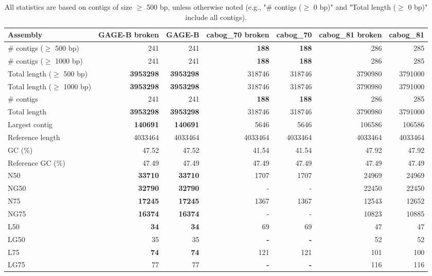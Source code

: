 \documentclass[12pt,a4paper]{article}
\begin{document}
\begin{table}[ht]
\begin{center}
\caption{All statistics are based on contigs of size $\geq$ 500 bp, unless otherwise noted (e.g., "\# contigs ($\geq$ 0 bp)" and "Total length ($\geq$ 0 bp)" include all contigs).}
\begin{tabular}{|l*{6}{|r}|}
\hline
Assembly & GAGE-B broken & GAGE-B & cabog\_70 broken & cabog\_70 & cabog\_81 broken & cabog\_81 \\ \hline
\# contigs ($\geq$ 500 bp) & 241 & 241 & {\bf 188} & {\bf 188} & 286 & 285 \\ \hline
\# contigs ($\geq$ 1000 bp) & 241 & 241 & {\bf 188} & {\bf 188} & 286 & 285 \\ \hline
Total length ($\geq$ 500 bp) & {\bf 3953298} & {\bf 3953298} & 318746 & 318746 & 3790980 & 3791000 \\ \hline
Total length ($\geq$ 1000 bp) & {\bf 3953298} & {\bf 3953298} & 318746 & 318746 & 3790980 & 3791000 \\ \hline
\# contigs & 241 & 241 & {\bf 188} & {\bf 188} & 286 & 285 \\ \hline
Total length & {\bf 3953298} & {\bf 3953298} & 318746 & 318746 & 3790980 & 3791000 \\ \hline
Largest contig & {\bf 140691} & {\bf 140691} & 5646 & 5646 & 106586 & 106586 \\ \hline
Reference length & 4033464 & 4033464 & 4033464 & 4033464 & 4033464 & 4033464 \\ \hline
GC (\%) & 47.52 & 47.52 & 41.54 & 41.54 & 47.92 & 47.92 \\ \hline
Reference GC (\%) & 47.49 & 47.49 & 47.49 & 47.49 & 47.49 & 47.49 \\ \hline
N50 & {\bf 33710} & {\bf 33710} & 1707 & 1707 & 24969 & 24969 \\ \hline
NG50 & {\bf 32790} & {\bf 32790} & - & - & 22450 & 22450 \\ \hline
N75 & {\bf 17245} & {\bf 17245} & 1367 & 1367 & 12543 & 12652 \\ \hline
NG75 & {\bf 16374} & {\bf 16374} & - & - & 10823 & 10885 \\ \hline
L50 & {\bf 34} & {\bf 34} & 69 & 69 & 47 & 47 \\ \hline
LG50 & 35 & 35 & {\bf -} & {\bf -} & 52 & 52 \\ \hline
L75 & {\bf 74} & {\bf 74} & 121 & 121 & 101 & 100 \\ \hline
LG75 & 77 & 77 & {\bf -} & {\bf -} & 116 & 116 \\ \hline

\end{tabular}
\end{center}
\end{table}
\end{document}
